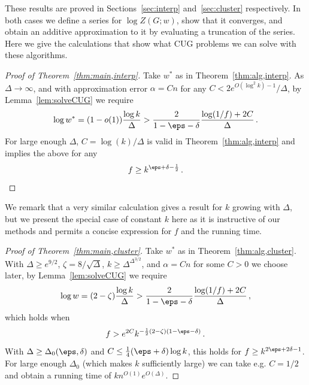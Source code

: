 %
These results are proved in Sections~\ref{sec:interp} and~\ref{sec:cluster} respectively. 
In both cases we define a series for $\log Z(G;w)$, show that it converges, and obtain an additive approximation to it by evaluating a truncation of the series. 
Here we give the calculations that show what CUG problems we can solve with these algorithms. 
%
\begin{proof}[Proof of Theorem~\ref{thm:main,interp}]
Take $w^*$ as in Theorem~\ref{thm:alg,interp}.
As $\Delta\to\infty$, and with approximation error $\alpha=Cn$ for any $C<2e^{O(\log^2k)-1}/\Delta$, by Lemma~\ref{lem:solveCUG} we require 
\[
\log w^* = (1-o(1))\frac{\log k}{\Delta} > \frac{2}{1-\eps-\delta}\frac{\log(1/f)+2C}{\Delta}\,.
\]
For large enough $\Delta$, $C=\log(k)/\Delta$ is valid in Theorem~\ref{thm:alg,interp} and implies the above for any
\[
f \ge k^{\eps+\delta-\frac{1}{2}}\,.\qedhere
\]
\end{proof}
We remark that a very similar calculation gives a result for $k$ growing with $\Delta$, but we present the special case of constant $k$ here as it is instructive of our methods and permits a concise expression for $f$ and the running time.
%
\begin{proof}[Proof of Theorem~\ref{thm:main,cluster}]
Take $w^*$ as in Theorem~\ref{thm:alg,cluster}. 
With $\Delta\ge e^{9/2}$, $\zeta=8/\sqrt\Delta$, $k\ge \Delta^{\Delta^{3/2}}$, and $\alpha=Cn$ for some $C>0$ we choose later, by Lemma~\ref{lem:solveCUG} we require 
\[
\log w = (2-\zeta)\frac{\log k}{\Delta} > \frac{2}{1-\eps-\delta}\frac{\log(1/f)+2C}{\Delta}\,,
\]
which holds when
\[
f > e^{2C}k^{-\frac{1}{2}(2-\zeta)(1-\eps-\delta)}\,.
\]
With $\Delta\ge\Delta_0(\eps,\delta)$ and $C \le \frac{1}{4}(\eps+\delta)\log k$, this holds for $f \ge k^{2\eps+2\delta-1}$.
For large enough $\Delta_0$ (which makes $k$ sufficiently large) we can take e.g. $C=1/2$ and obtain a running time of $kn^{O(1)}e^{O(\Delta)}$.
\end{proof}
%
%
